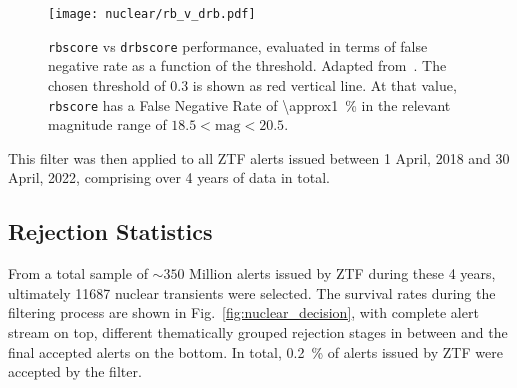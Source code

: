 \begin{figure}[htpb]
    \texttt{[image: nuclear/rb\_v\_drb.pdf]}
    \caption[\texttt{rbscore}/\texttt{drbscore} performance]{\texttt{rbscore} vs \texttt{drbscore} performance, evaluated in terms of false negative rate as a function of the threshold. Adapted from~\cite{Duev2019}. The chosen threshold of 0.3 is shown as red vertical line. At that value, \texttt{rbscore} has a False Negative Rate of \SI{\approx1}{\percent} in the relevant magnitude range of $18.5 < \text{mag} < 20.5$.}
\end{figure}

This filter was then applied to all ZTF alerts issued between 1 April, 2018 and 30 April, 2022, comprising over 4 years of data in total.

\subsection{Rejection Statistics}
From a total sample of $\sim 350$ Million alerts issued by ZTF during these 4 years, ultimately 11687 nuclear transients were selected. The survival rates during the filtering process are shown in Fig.~\ref{fig:nuclear_decision}, with complete alert stream on top, different thematically grouped rejection stages in between and the final accepted alerts on the bottom. In total, \SI{0.2}{\percent} of alerts issued by ZTF were accepted by the filter.

